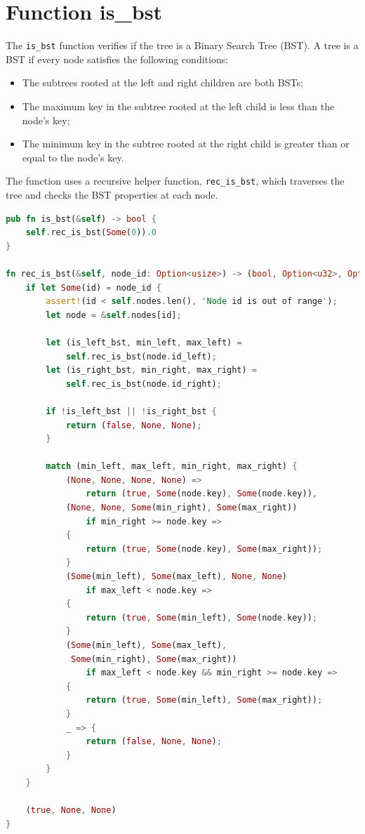 \documentclass[a4paper,12pt]{article}
\begin{document}
\section{Function is\_bst}
The \texttt{is\_bst} function verifies if the tree is a Binary Search Tree (BST). A tree is a BST if every node satisfies the following conditions:
\begin{itemize}
    \item The subtrees rooted at the left and right children are both BSTs;
    \item The maximum key in the subtree rooted at the left child is less than the node's key;
    \item The minimum key in the subtree rooted at the right child is greater than or equal to the node's key.
\end{itemize}

The function uses a recursive helper function, \texttt{rec\_is\_bst}, which traverses the tree and checks the BST properties at each node.

\begin{lstlisting}[language=Rust, style=boxed, caption=The \texttt{is\_bst} Function]
pub fn is_bst(&self) -> bool {
    self.rec_is_bst(Some(0)).0
}

fn rec_is_bst(&self, node_id: Option<usize>) -> (bool, Option<u32>, Option<u32>) {
    if let Some(id) = node_id {
        assert!(id < self.nodes.len(), 'Node id is out of range');
        let node = &self.nodes[id];

        let (is_left_bst, min_left, max_left) = 
            self.rec_is_bst(node.id_left);
        let (is_right_bst, min_right, max_right) = 
            self.rec_is_bst(node.id_right);

        if !is_left_bst || !is_right_bst {
            return (false, None, None);
        }

        match (min_left, max_left, min_right, max_right) {
            (None, None, None, None) => 
                return (true, Some(node.key), Some(node.key)),
            (None, None, Some(min_right), Some(max_right)) 
                if min_right >= node.key => 
            {
                return (true, Some(node.key), Some(max_right));
            }
            (Some(min_left), Some(max_left), None, None) 
                if max_left < node.key => 
            {
                return (true, Some(min_left), Some(node.key));
            }
            (Some(min_left), Some(max_left),
             Some(min_right), Some(max_right))
                if max_left < node.key && min_right >= node.key =>
            {
                return (true, Some(min_left), Some(max_right));
            }
            _ => {
                return (false, None, None);
            }
        }
    }

    (true, None, None)
}
\end{lstlisting}
\end{document}
